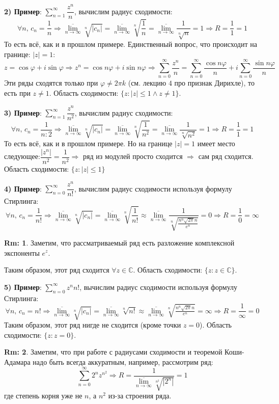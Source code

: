 \documentclass[12pt]{article}
\newcommand{\MC}{\mathbb{C}}
\theoremstyle{definition}
\newtheorem{rem}{Rm:}
\newcommand{\ddsum}[2]{\displaystyle\sum\limits_{#1}^{#2}}
\begin{document}
\textbf{2) Пример}: $\ddsum{n = 1}{\infty}\dfrac{z^n}{n}$, вычислим радиус сходимости: 
$$
	\forall n, \, c_n = \dfrac{1}{n} \Rightarrow \underset{n \to \infty}{\overline{\lim}}\sqrt[n]{|c_n|}  = \underset{n \to \infty}{\overline{\lim}}\sqrt[n]{\dfrac{1}{n}} = \underset{n \to \infty}{\overline{\lim}} \dfrac{1}{\sqrt[n]{n}}  = 1 \Rightarrow R = \dfrac{1}{1} = 1
$$
То есть всё, как и в прошлом примере. Единственный вопрос, что происходит на границе: $|z| = 1$:
$$
	z = \cos{\varphi} + i \sin{\varphi} \Rightarrow z^n = \cos{n \varphi} + i \sin{n \varphi} \Rightarrow \ddsum{n = 0}{\infty}\dfrac{z^n}{n} = \ddsum{n = 0}{\infty}\dfrac{\cos{n \varphi}}{n} + i \ddsum{n = 0}{\infty}\dfrac{\sin{n \varphi}}{n}
$$
Эти ряды сходятся только при $\varphi \neq 2\pi k$ (см. лекцию $4$ про признак Дирихле), то есть при $z \neq 1$. Область сходимости: $\{z \colon |z| \leq 1 \wedge z  \neq 1\}$.

\textbf{3) Пример}: $\ddsum{n = 1}{\infty}\dfrac{z^n}{n^2}$, вычислим радиус сходимости: 
$$
	\forall n, \, c_n = \dfrac{1}{n:2} \Rightarrow \underset{n \to \infty}{\overline{\lim}}\sqrt[n]{|c_n|}  = \underset{n \to \infty}{\overline{\lim}}\sqrt[n]{\dfrac{1}{n^2}} = \underset{n \to \infty}{\overline{\lim}} \dfrac{1}{\sqrt[n]{n^2}}  = 1 \Rightarrow R = \dfrac{1}{1} = 1
$$
То есть всё, как и в прошлом примере. Но на границе $|z| = 1$ имеет место следующее:$\dfrac{|z^n|}{n^2} =  \dfrac{1}{n^2 } \Rightarrow$ ряд из модулей просто сходится $\Rightarrow$ сам ряд сходится. Область сходимости: $\{z \colon |z| \leq 1 \}$

\textbf{4) Пример}: $\ddsum{n = 0}{\infty}\dfrac{z^n}{n!}$, вычислим радиус сходимости используя формулу Стирлинга:
$$
	\forall n, \, c_n = \dfrac{1}{n!} \Rightarrow \underset{n \to \infty}{\overline{\lim}}\sqrt[n]{|c_n|}  = \underset{n \to \infty}{\overline{\lim}}\sqrt[n]{\dfrac{1}{n!}} \approx \underset{n \to \infty}{\overline{\lim}} \dfrac{1}{\sqrt[n]{\tfrac{n^n \sqrt{2 \pi}n}{e^n}}}  = 0 \Rightarrow R = \dfrac{1}{0} = \infty
$$
\begin{rem}
	Заметим, что рассматриваемый ряд есть разложение комплексной экспоненты $e^z$.
\end{rem}
Таким образом, этот ряд сходится $\forall z \in \MC$. Область сходимости: $\{z \colon z \in \MC \}$.

\textbf{5) Пример}: $\ddsum{n = 0}{\infty}z^n n!$, вычислим радиус сходимости используя формулу Стирлинга:
$$
	\forall n, \, c_n = n! \Rightarrow \underset{n \to \infty}{\overline{\lim}}\sqrt[n]{|c_n|}  = \underset{n \to \infty}{\overline{\lim}}\sqrt[n]{n!} \approx \underset{n \to \infty}{\overline{\lim}} \sqrt[n]{\tfrac{n^n \sqrt{2 \pi}n}{e^n}}  = \infty \Rightarrow R = \dfrac{1}{\infty} = 0
$$
Таким образом, этот ряд нигде не сходится (кроме точки $z = 0$). Область сходимости: $\{z \colon z = 0 \}$.
\begin{rem}
	Заметим, что при работе с радиусами сходимости и теоремой Коши-Адамара надо быть всегда аккуратным, например, рассмотрим ряд:
	$$
		\ddsum{n = 0}{\infty}2^nz^{n^2} \Rightarrow R = \dfrac{1}{\underset{n \to \infty}{\overline{\lim}}\sqrt[n^2]{|2^n|}} = 1
	$$
	где степень корня уже не $n$, а $n^2$ из-за строения ряда.
\end{rem}
\end{document}
